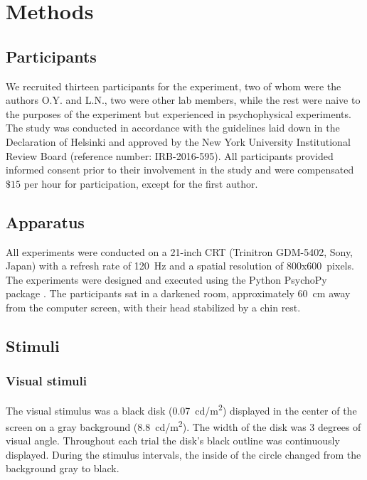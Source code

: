 \documentclass{biorxiv}
\providecommand{\citep}[1]{\cite{#1}}
\begin{document}
\section{Methods}

\subsection{Participants}
We recruited thirteen participants for the experiment, two of whom were the authors O.Y. and L.N., two were other lab members, while the rest were naive to the purposes of the experiment but experienced in psychophysical experiments.
The study was conducted in accordance with the guidelines laid down in the Declaration of Helsinki and approved by the New York University Institutional Review Board (reference number: IRB-2016-595). All participants provided informed consent prior to their involvement in the study and were compensated $\$15$ per hour for participation, except for the first author.


\subsection{Apparatus}

All experiments were conducted on a 21-inch CRT (Trinitron GDM-5402, Sony, Japan) with a refresh rate of 120~Hz and a spatial resolution of 800x600~pixels. The experiments were designed and executed using the Python PsychoPy package \citep{peirce2007psychopy}. The participants sat in a darkened room, approximately 60~cm away from the computer screen, with their head stabilized by a chin rest.

\subsection{Stimuli}

\subsubsection{Visual stimuli}

The visual stimulus was a black disk (0.07~cd/m\textsuperscript{2}) displayed in the center of the screen on a gray background (8.8~cd/m\textsuperscript{2}). The width of the disk was 3 degrees of visual angle. Throughout each trial the disk's black outline was continuously displayed. During the stimulus intervals, the inside of the circle changed from the background gray to black.
\end{document}
